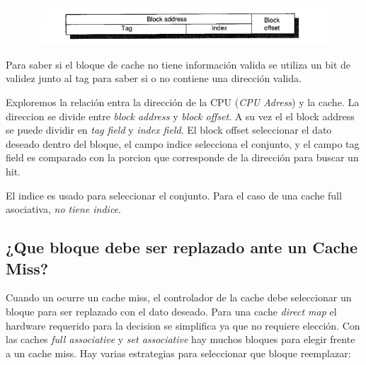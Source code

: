 \documentclass{article}
\begin{document}
\begin{figure}[h!]
    \includegraphics[width=\linewidth]{imagenes/DireccionVsCache.png}
\end{figure}

Para saber si el bloque de cache no tiene información valida se utiliza un bit de validez junto al tag para saber si o no contiene una dirección valida.

Exploremos la relación entra la dirección de la CPU (\textit{CPU Adress}) y la cache. La direccion se divide entre \textit{block address} y \textit{block offset}.
A su vez el el block address se puede dividir en \textit{tag field} y \textit{index field}. 
El block offset seleccionar el dato deseado dentro del bloque, el campo indice selecciona el conjunto, y el campo tag field es comparado con la porcion que corresponde de la dirección para buscar un hit. 

El indice es usado para seleccionar el conjunto. Para el caso de una cache full asociativa, \textit{no tiene indice}.

\subsection{¿Que bloque debe ser replazado ante un Cache Miss?}

Cuando un ocurre un cache miss, el controlador de la cache debe seleccionar un bloque para ser replazado con el dato deseado.
Para una cache \textit{direct map} el hardware requerido para la decision se simplifica ya que no requiere elección.
Con las caches \textit{full associative} y \textit{set associative} hay muchos bloques para elegir frente a un cache miss.
Hay varias estrategias para seleccionar que bloque reemplazar:
\end{document}
